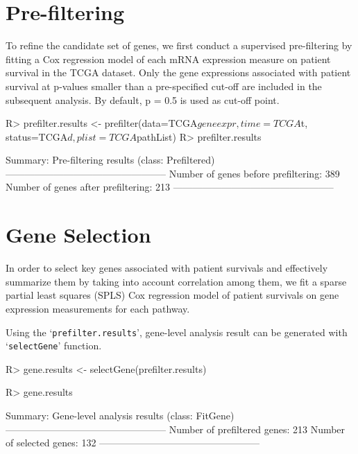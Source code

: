 \documentclass[11pt]{article}
\begin{document}
\section{Pre-filtering}

To refine the candidate set of genes, we first conduct a supervised pre-filtering by fitting a Cox regression model of each mRNA expression measure on patient survival in the TCGA dataset. Only the gene expressions associated with patient survival at p-values smaller than a pre-specified cut-off are included in the subsequent analysis. By default, p = 0.5 is used as cut-off point.

\begin{Schunk}
\begin{Sinput}
R> prefilter.results <- prefilter(data=TCGA$geneexpr, time=TCGA$t, status=TCGA$d, plist=TCGA$pathList)
R> prefilter.results
\end{Sinput}
\begin{Soutput}
Summary: Pre-filtering results (class: Prefiltered)
--------------------------------------------------
Number of genes before prefiltering: 389
Number of genes after prefiltering: 213
--------------------------------------------------
\end{Soutput}
\end{Schunk}

\section{Gene Selection}
In order to select key genes associated with patient survivals and effectively summarize them by taking into account correlation among them, we fit a sparse partial least squares (SPLS) Cox regression model \cite{SPLS} of patient survivals on gene expression measurements for each pathway.

Using the `\texttt{prefilter.results}', gene-level analysis result can be generated with `\texttt{selectGene}' function.

\begin{Schunk}
\begin{Sinput}
R> gene.results <- selectGene(prefilter.results)
\end{Sinput}
\end{Schunk}
\begin{Schunk}
\begin{Sinput}
R> gene.results
\end{Sinput}
\begin{Soutput}
Summary: Gene-level analysis results (class: FitGene)
--------------------------------------------------
Number of prefiltered genes: 213
Number of selected genes: 132
--------------------------------------------------
\end{Soutput}
\end{Schunk}
\end{document}
